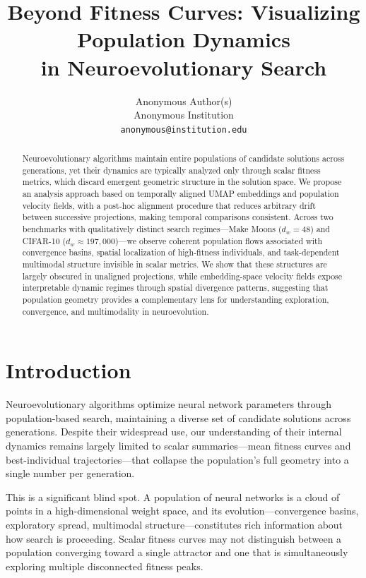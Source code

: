 \documentclass{article}
\title{Beyond Fitness Curves: Visualizing Population Dynamics\\in Neuroevolutionary Search}
\author{%
  Anonymous Author(s)\\
  Anonymous Institution\\
  \texttt{anonymous@institution.edu}
}
\begin{document}
\maketitle

\begin{abstract}
Neuroevolutionary algorithms maintain entire populations of candidate
solutions across generations, yet their dynamics are typically analyzed
only through scalar fitness metrics, which discard emergent geometric
structure in the solution space. We propose an analysis approach based
on temporally aligned UMAP embeddings and population velocity fields,
with a post-hoc alignment procedure that reduces arbitrary drift between
successive projections, making temporal comparisons consistent. Across
two benchmarks with qualitatively distinct search regimes---Make Moons
($d_w = 48$) and CIFAR-10 ($d_w \approx 197{,}000$)---we observe coherent
population flows associated with convergence basins, spatial localization
of high-fitness individuals, and task-dependent multimodal structure
invisible in scalar metrics. We show that these structures are largely
obscured in unaligned projections, while embedding-space velocity fields
expose interpretable dynamic regimes through spatial divergence patterns,
suggesting that population geometry provides a complementary lens for
understanding exploration, convergence, and multimodality in neuroevolution.
\end{abstract}


\section{Introduction}

Neuroevolutionary algorithms \cite{stanley2002evolving,such2017deep}
optimize neural network parameters through population-based search,
maintaining a diverse set of candidate solutions across generations.
Despite their widespread use, our understanding of their internal
dynamics remains largely limited to scalar summaries---mean fitness
curves and best-individual trajectories---that collapse the
population's full geometry into a single number per generation.

This is a significant blind spot. A population of neural networks is
a cloud of points in a high-dimensional weight space, and its
evolution---convergence basins, exploratory spread, multimodal
structure---constitutes rich information about how search is
proceeding. Scalar fitness curves may not distinguish between a
population converging toward a single attractor and one that is
simultaneously exploring multiple disconnected fitness peaks.
\end{document}

